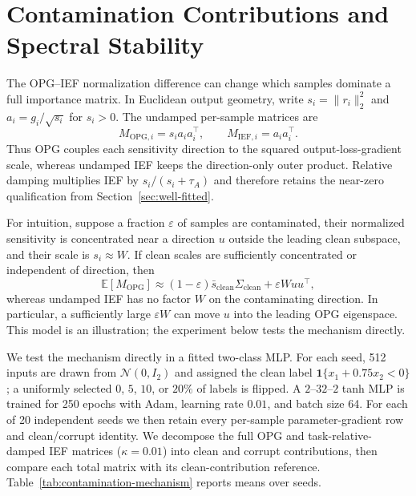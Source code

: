 \section{Contamination Contributions and Spectral Stability}
\label{app:contamination}

The OPG--IEF normalization difference can change which samples dominate a full importance matrix. In Euclidean output geometry, write $s_i=\|r_i\|_2^2$ and $a_i=g_i/\sqrt{s_i}$ for $s_i>0$. The undamped per-sample matrices are
\[
M_{\mathrm{OPG},i}=s_i a_i a_i^\top,
\qquad
M_{\mathrm{IEF},i}=a_i a_i^\top.
\]
Thus OPG couples each sensitivity direction to the squared output-loss-gradient scale, whereas undamped IEF keeps the direction-only outer product. Relative damping multiplies IEF by $s_i/(s_i+\tau_A)$ and therefore retains the near-zero qualification from Section~\ref{sec:well-fitted}.

For intuition, suppose a fraction $\varepsilon$ of samples are contaminated, their normalized sensitivity is concentrated near a direction $u$ outside the leading clean subspace, and their scale is $s_i\approx W$. If clean scales are sufficiently concentrated or independent of direction, then
\[
\mathbb E[M_{\mathrm{OPG}}]
\approx
(1-\varepsilon)\bar s_{\mathrm{clean}}\Sigma_{\mathrm{clean}}
+\varepsilon Wuu^\top,
\]
whereas undamped IEF has no factor $W$ on the contaminating direction. In particular, a sufficiently large $\varepsilon W$ can move $u$ into the leading OPG eigenspace. This model is an illustration; the experiment below tests the mechanism directly.

We test the mechanism directly in a fitted two-class MLP. For each seed, 512 inputs are drawn from $\mathcal N(0,I_2)$ and assigned the clean label $\mathbf{1}\{x_1+0.75x_2<0\}$; a uniformly selected $0$, $5$, $10$, or $20\%$ of labels is flipped. A $2$--$32$--$2$ tanh MLP is trained for 250 epochs with Adam, learning rate $0.01$, and batch size 64. For each of 20 independent seeds we then retain every per-sample parameter-gradient row and clean/corrupt identity. We decompose the full OPG and task-relative-damped IEF matrices ($\kappa=0.01$) into clean and corrupt contributions, then compare each total matrix with its clean-contribution reference. Table~\ref{tab:contamination-mechanism} reports means over seeds.

